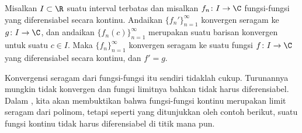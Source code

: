 \begin{thm} \label{thm:dersconvergecomplex}
Misalkan $I \subset \R$ suatu interval terbatas dan misalkan
$f_n \colon I \to \C$ fungsi-fungsi yang diferensiabel secara kontinu.
Andaikan $\{ f_n' \}_{n=1}^\infty$ konvergen seragam ke $g \colon I \to \C$,
dan andaikan $\{ f_n(c) \}_{n=1}^\infty$ merupakan suatu
barisan konvergen untuk suatu $c \in I$.  Maka $\{ f_n \}_{n=1}^\infty$ konvergen seragam ke 
suatu fungsi $f \colon I \to \C$ yang diferensiabel secara kontinu, dan $f' = g$.
\end{thm}

Konvergensi seragam dari fungsi-fungsi itu sendiri tidaklah cukup.
Turunannya mungkin tidak konvergen dan fungsi limitnya bahkan tidak harus
diferensiabel.
Dalam , kita akan membuktikan bahwa
fungsi-fungsi kontinu merupakan limit seragam dari polinom, tetapi seperti yang ditunjukkan oleh
contoh berikut, suatu fungsi kontinu tidak harus diferensiabel
di titik mana pun.

